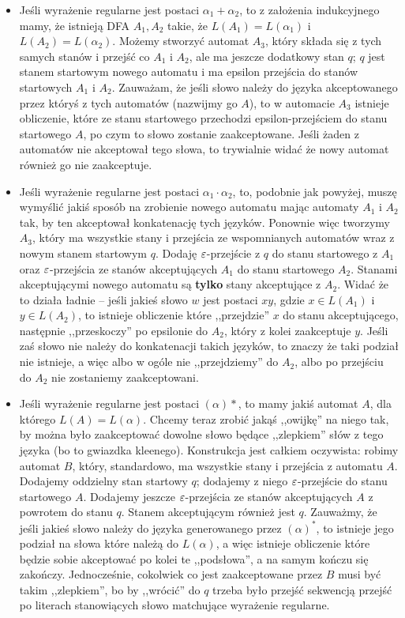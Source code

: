     \begin{itemize}
        \item Jeśli wyrażenie regularne jest postaci \( \alpha_1 + \alpha_2 \), to z założenia indukcyjnego mamy, że istnieją DFA \(A_1, A_2\) takie, że \(L(A_1) = L(\alpha_1)\) i \(L(A_2) = L(\alpha_2)\). Możemy stworzyć automat \(A_3\), który składa się z tych samych stanów i przejść co \(A_1\) i \(A_2\), ale ma jeszcze dodatkowy stan \(q\); \(q\) jest stanem startowym nowego automatu i ma epsilon przejścia do stanów startowych \(A_1\) i \(A_2\).  Zauważam, że jeśli słowo należy do języka akceptowanego przez któryś z tych automatów (nazwijmy go \(A\)), to w automacie \(A_3\) istnieje obliczenie, które ze stanu startowego przechodzi epsilon-przejściem do stanu startowego \(A\), po czym to słowo zostanie zaakceptowane. Jeśli żaden z automatów nie akceptował tego słowa, to trywialnie widać że nowy automat również go nie zaakceptuje.
        \item Jeśli wyrażenie regularne jest postaci \( \alpha_1 \cdot \alpha_2 \), to, podobnie jak powyżej, muszę wymyślić jakiś sposób na zrobienie nowego automatu mając automaty \(A_1\) i \(A_2\) tak, by ten akceptował konkatenację tych języków. Ponownie więc tworzymy \(A_3\), który ma wszystkie stany i przejścia ze wspomnianych automatów wraz z nowym stanem startowym \(q\). Dodaję \(\varepsilon\)-przejście z \(q\) do stanu startowego z \(A_1\) oraz \(\varepsilon\)-przejścia ze stanów akceptujących \(A_1\) do stanu startowego \(A_2\). Stanami akceptującymi nowego automatu są \textbf{tylko} stany akceptujące z \(A_2\). Widać że to działa ładnie -- jeśli jakieś słowo \(w\) jest postaci \(xy\), gdzie \(x\in L(A_1)\) i \(y \in L(A_2)\), to istnieje obliczenie które ,,przejdzie'' \(x\) do stanu akceptującego, następnie ,,przeskoczy'' po epsilonie do \(A_2\), który z kolei zaakceptuje \(y\). Jeśli zaś słowo nie należy do konkatenacji takich języków, to znaczy że taki podział nie istnieje, a więc albo w ogóle nie ,,przejdziemy'' do \(A_2\), albo po przejściu do \(A_2\) nie zostaniemy zaakceptowani. 
        \item Jeśli wyrażenie regularne jest postaci \((\alpha)*\), to mamy jakiś automat \(A\), dla którego \(L(A) = L(\alpha)\). Chcemy teraz zrobić jakąś ,,owijkę'' na niego tak, by można było zaakceptować dowolne słowo będące ,,zlepkiem'' słów z tego języka (bo to gwiazdka kleenego). Konstrukcja jest całkiem oczywista: robimy automat \(B\), który, standardowo, ma wszystkie stany i przejścia z automatu \(A\). Dodajemy oddzielny stan startowy \(q\); dodajemy z niego \(\varepsilon\)-przejście do stanu startowego \(A\). Dodajemy jeszcze \(\varepsilon\)-przejścia ze stanów akceptujących \(A\) z powrotem do stanu \(q\). Stanem akceptującym również jest \(q\). Zauważmy, że jeśli jakieś słowo należy do języka generowanego przez \((\alpha)^*\), to istnieje jego podział na słowa które należą do \(L(\alpha)\), a więc istnieje obliczenie które będzie sobie akceptować po kolei te ,,podsłowa'', a na samym kończu się zakończy. Jednocześnie, cokolwiek co jest zaakceptowane przez \(B\) musi być takim ,,zlepkiem'', bo by ,,wrócić'' do \(q\) trzeba było przejść sekwencją przejść po literach stanowiących słowo matchujące wyrażenie regularne.
    \end{itemize}
    